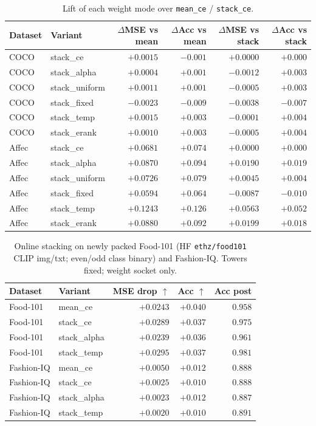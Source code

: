 \begin{table}[t]
\centering
\caption{Lift of each weight mode over \texttt{mean\_ce} / \texttt{stack\_ce}.}
\label{tab:agod-weight-sweep-lift}
\begin{tabular}{llrrrr}
\toprule
Dataset & Variant & $\Delta$MSE vs mean & $\Delta$Acc vs mean & $\Delta$MSE vs stack & $\Delta$Acc vs stack \\
\midrule
COCO  & stack\_ce        & $+0.0015$ & $-0.001$ & $+0.0000$ & $+0.000$ \\
COCO  & stack\_alpha     & $+0.0004$ & $+0.001$ & $-0.0012$ & $+0.003$ \\
COCO  & stack\_uniform   & $+0.0011$ & $+0.001$ & $-0.0005$ & $+0.003$ \\
COCO  & stack\_fixed     & $-0.0023$ & $-0.009$ & $-0.0038$ & $-0.007$ \\
COCO  & stack\_temp      & $+0.0015$ & $+0.003$ & $-0.0001$ & $+0.004$ \\
COCO  & stack\_erank     & $+0.0010$ & $+0.003$ & $-0.0005$ & $+0.004$ \\
\midrule
Affec & stack\_ce        & $+0.0681$ & $+0.074$ & $+0.0000$ & $+0.000$ \\
Affec & stack\_alpha     & $+0.0870$ & $+0.094$ & $+0.0190$ & $+0.019$ \\
Affec & stack\_uniform   & $+0.0726$ & $+0.079$ & $+0.0045$ & $+0.004$ \\
Affec & stack\_fixed     & $+0.0594$ & $+0.064$ & $-0.0087$ & $-0.010$ \\
Affec & stack\_temp      & $+0.1243$ & $+0.126$ & $+0.0563$ & $+0.052$ \\
Affec & stack\_erank     & $+0.0880$ & $+0.092$ & $+0.0199$ & $+0.018$ \\
\bottomrule
\end{tabular}
\end{table}

\begin{table}[t]
\centering
\caption{Online stacking on newly packed Food-101 (HF \texttt{ethz/food101} CLIP img/txt;
even/odd class binary) and Fashion-IQ. Towers fixed; weight socket only.}
\label{tab:agod-food101-fashion}
\begin{tabular}{llrrr}
\toprule
Dataset & Variant & MSE drop $\uparrow$ & Acc $\uparrow$ & Acc post \\
\midrule
Food-101 & mean\_ce & $+0.0243$ & $+0.040$ & $0.958$ \\
Food-101 & stack\_ce & $+0.0289$ & $+0.037$ & $0.975$ \\
Food-101 & stack\_alpha & $+0.0239$ & $+0.036$ & $0.961$ \\
Food-101 & stack\_temp & $+0.0295$ & $+0.037$ & $0.981$ \\
\midrule
Fashion-IQ & mean\_ce & $+0.0050$ & $+0.012$ & $0.888$ \\
Fashion-IQ & stack\_ce & $+0.0025$ & $+0.010$ & $0.888$ \\
Fashion-IQ & stack\_alpha & $+0.0023$ & $+0.012$ & $0.887$ \\
Fashion-IQ & stack\_temp & $+0.0020$ & $+0.010$ & $0.891$ \\
\bottomrule
\end{tabular}
\end{table}
